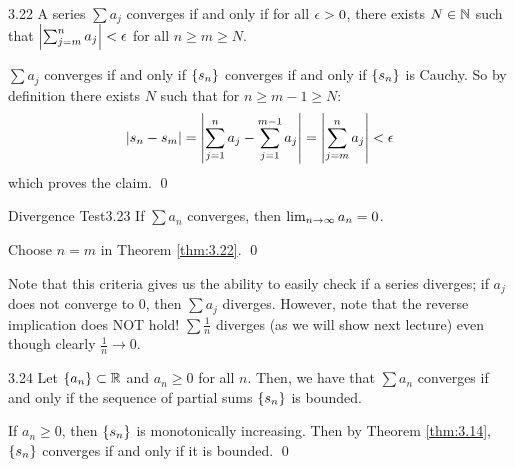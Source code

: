 \begin{theorem}{}{3.22}
    A series $\sum a_j$ converges if and only if for all $\epsilon > 0$, there exists $N \in \mathbb{N}$ such that $\abs{\sum_{j=m}^n a_j} < \epsilon$ for all $n \geq m \geq N$.
\end{theorem}
\begin{nproof}
    $\sum a_j$ converges if and only if $\set{s_n}$ converges if and only if $\set{s_n}$ is Cauchy. So by definition there exists $N$ such that for $n \geq m - 1 \geq N$:
    \begin{align*}
        \abs{s_n - s_m} = \abs{\sum_{j=1}^n a_j - \sum_{j=1}^{m-1} a_j} = \abs{\sum_{j=m}^n a_j} < \epsilon
    \end{align*}
    which proves the claim. \qed
\end{nproof}

\begin{theorem}{Divergence Test}{3.23}
    If $\sum a_n$ converges, then $\lim_{n \rightarrow \infty} a_n = 0$.
\end{theorem}
\begin{nproof}
    Choose $n = m$ in Theorem \ref{thm:3.22}. \qed
\end{nproof}
\noindent Note that this criteria gives us the ability to easily check if a series diverges; if $a_j$ does not converge to $0$, then $\sum a_j$ diverges. However, note that the reverse implication does NOT hold! $\sum \frac{1}{n}$ diverges (as we will show next lecture) even though clearly $\frac{1}{n} \rightarrow 0$. 

\begin{theorem}{}{3.24}
    Let $\set{a_n} \subset \mathbb{R}$ and $a_n \geq 0$ for all $n$. Then, we have that $\sum a_n$ converges if and only if the sequence of partial sums $\set{s_n}$ is bounded.
\end{theorem}
\begin{nproof}
    If $a_n \geq 0$, then $\set{s_n}$ is monotonically increasing. Then by Theorem \ref{thm:3.14}, $\set{s_n}$ converges if and only if it is bounded. \qed
\end{nproof}

